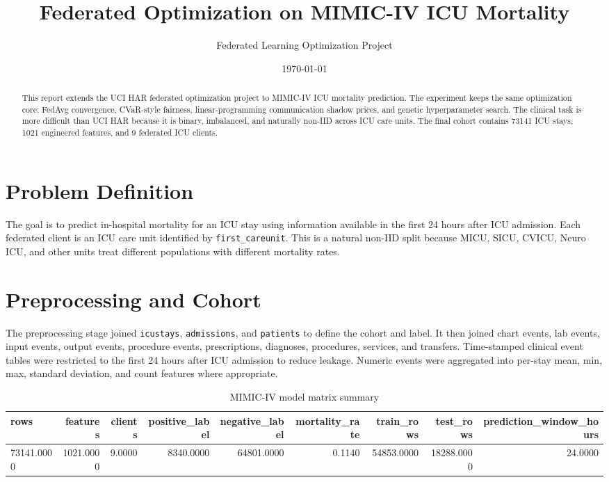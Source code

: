 \documentclass[11pt]{article}
\title{Federated Optimization on MIMIC-IV ICU Mortality}
\author{Federated Learning Optimization Project}
\date{\today}
\begin{document}
\maketitle

\begin{abstract}
This report extends the UCI HAR federated optimization project to MIMIC-IV ICU mortality prediction. The experiment keeps the same optimization core: FedAvg convergence, CVaR-style fairness, linear-programming communication shadow prices, and genetic hyperparameter search. The clinical task is more difficult than UCI HAR because it is binary, imbalanced, and naturally non-IID across ICU care units. The final cohort contains 73141 ICU stays, 1021 engineered features, and 9 federated ICU clients.
\end{abstract}

\tableofcontents
\newpage

\section{Problem Definition}
The goal is to predict in-hospital mortality for an ICU stay using information available in the first 24 hours after ICU admission. Each federated client is an ICU care unit identified by \texttt{first\_careunit}. This is a natural non-IID split because MICU, SICU, CVICU, Neuro ICU, and other units treat different populations with different mortality rates.

\section{Preprocessing and Cohort}
The preprocessing stage joined \texttt{icustays}, \texttt{admissions}, and \texttt{patients} to define the cohort and label. It then joined chart events, lab events, input events, output events, procedure events, prescriptions, diagnoses, procedures, services, and transfers. Time-stamped clinical event tables were restricted to the first 24 hours after ICU admission to reduce leakage. Numeric events were aggregated into per-stay mean, min, max, standard deviation, and count features where appropriate.

\begin{table}[H]
\centering
\caption{MIMIC-IV model matrix summary}
\label{tab:dataset}
\begin{tabular}{lrrrrrrrr}
\toprule
rows & features & clients & positive\_label & negative\_label & mortality\_rate & train\_rows & test\_rows & prediction\_window\_hours \\
\midrule
73141.0000 & 1021.0000 & 9.0000 & 8340.0000 & 64801.0000 & 0.1140 & 54853.0000 & 18288.0000 & 24.0000 \\
\bottomrule
\end{tabular}
\end{table}
\end{document}
